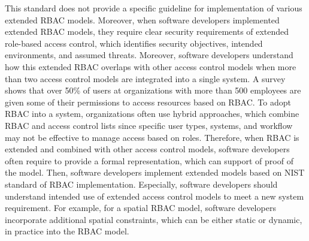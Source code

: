 This standard does not provide a specific guideline for implementation of various extended RBAC models.
Moreover, when software developers implemented extended RBAC models, they require clear security requirements of extended role-based access control, which identifies security objectives, intended environments, and assumed threats. Moreover, software developers understand how this extended RBAC overlaps with other access control models when more than two access control models are integrated into a single system. A survey~\cite{o20102010} shows that over 50\% of users at organizations with more than 500 employees are given some of their permissions to access resources based on RBAC. To adopt RBAC into a system, organizations often use hybrid approaches, which combine RBAC and access control lists since specific user types, systems, and workflow may not be effective to manage access based on roles. Therefore, when RBAC is extended and combined with other access control models, software developers often require to provide a formal representation, which can support of proof of the model. Then, software developers implement extended models based on NIST standard of RBAC implementation. Especially, software developers should understand intended use of extended access control models to meet a new system requirement. For example, for a spatial RBAC model, software developers incorporate additional spatial constraints, which can be either static or dynamic, in practice into the RBAC model.


